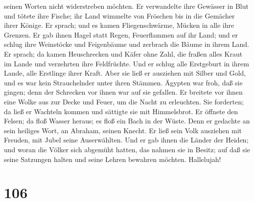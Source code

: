 seinen Worten nicht widerstreben möchten.  Er verwandelte
ihre Gewässer in Blut und tötete ihre Fische;  ihr Land
wimmelte von Fröschen bis in die Gemächer ihrer Könige. 
Er sprach; und es kamen Fliegenschwärme, Mücken in alle ihre Grenzen.
 Er gab ihnen Hagel statt Regen, Feuerflammen auf ihr
Land;  und er schlug ihre Weinstöcke und Feigenbäume und
zerbrach die Bäume in ihrem Land.  Er sprach; da kamen
Heuschrecken und Käfer ohne Zahl,  die fraßen alles Kraut
im Lande und verzehrten ihre Feldfrüchte.  Und er schlug
alle Erstgeburt in ihrem Lande, alle Erstlinge ihrer Kraft.
 Aber sie ließ er ausziehen mit Silber und Gold, und es
war kein Strauchelnder unter ihren Stämmen.  Ägypten war
froh, daß sie gingen; denn der Schrecken vor ihnen war auf sie gefallen.
 Er breitete vor ihnen eine Wolke aus zur Decke und
Feuer, um die Nacht zu erleuchten.  Sie forderten; da
ließ er Wachteln kommen und sättigte sie mit Himmelsbrot.
 Er öffnete den Felsen; da floß Wasser heraus; es floß
ein Bach in der Wüste.  Denn er gedachte an sein heiliges
Wort, an Abraham, seinen Knecht.  Er ließ sein Volk
ausziehen mit Freuden, mit Jubel seine Auserwählten.  Und
er gab ihnen die Länder der Heiden; und woran die Völker sich abgemüht
hatten, das nahmen sie in Besitz;  auf daß sie seine
Satzungen halten und seine Lehren bewahren möchten. Hallelujah!

\hypertarget{section-105}{%
\section{106}\label{section-105}}

